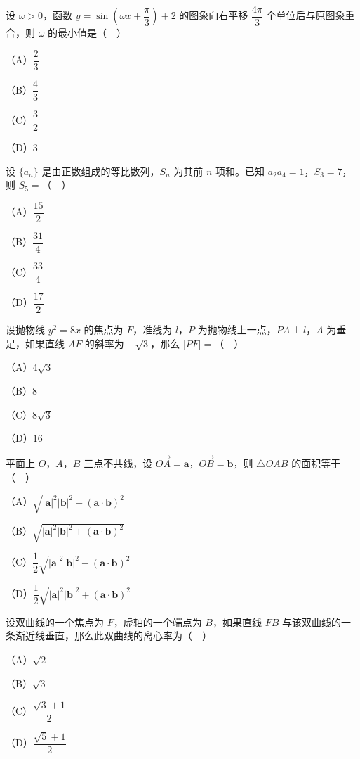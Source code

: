 \endgroup
\begin{question}
设 $\omega>0$，函数 $y=\sin\left(\omega x+\dfrac{\pi}{3}\right)+2$ 的图象向右平移 $\dfrac{4\pi}{3}$ 个单位后与原图象重合，则 $\omega$ 的最小值是（　）

（A）$\dfrac23$

（B）$\dfrac43$

（C）$\dfrac32$

（D）$3$

\end{question}
\begin{question}
设 $\{a_n\}$ 是由正数组成的等比数列，$S_n$ 为其前 $n$ 项和。已知 $a_2a_4=1$，$S_3=7$，则 $S_5=$（　）

（A）$\dfrac{15}{2}$

（B）$\dfrac{31}{4}$

（C）$\dfrac{33}{4}$

（D）$\dfrac{17}{2}$

\end{question}
\begin{question}
设抛物线 $y^2=8x$ 的焦点为 $F$，准线为 $l$，$P$ 为抛物线上一点，$PA\perp l$，$A$ 为垂足，如果直线 $AF$ 的斜率为 $-\sqrt3$，那么 $|PF|=$（　）

（A）$4\sqrt3$

（B）$8$

（C）$8\sqrt3$

（D）$16$

\end{question}
\begin{question}
平面上 $O$，$A$，$B$ 三点不共线，设 $\overrightarrow{OA}=\boldsymbol a$，$\overrightarrow{OB}=\boldsymbol b$，则 $\triangle OAB$ 的面积等于（　）

（A）$\sqrt{|\boldsymbol a|^2|\boldsymbol b|^2-(\boldsymbol a\cdot\boldsymbol b)^2}$

（B）$\sqrt{|\boldsymbol a|^2|\boldsymbol b|^2+(\boldsymbol a\cdot\boldsymbol b)^2}$

（C）$\dfrac12\sqrt{|\boldsymbol a|^2|\boldsymbol b|^2-(\boldsymbol a\cdot\boldsymbol b)^2}$

（D）$\dfrac12\sqrt{|\boldsymbol a|^2|\boldsymbol b|^2+(\boldsymbol a\cdot\boldsymbol b)^2}$

\end{question}
\begin{question}
设双曲线的一个焦点为 $F$，虚轴的一个端点为 $B$，如果直线 $FB$ 与该双曲线的一条渐近线垂直，那么此双曲线的离心率为（　）

（A）$\sqrt2$

（B）$\sqrt3$

（C）$\dfrac{\sqrt3+1}{2}$

（D）$\dfrac{\sqrt5+1}{2}$

\end{question}
